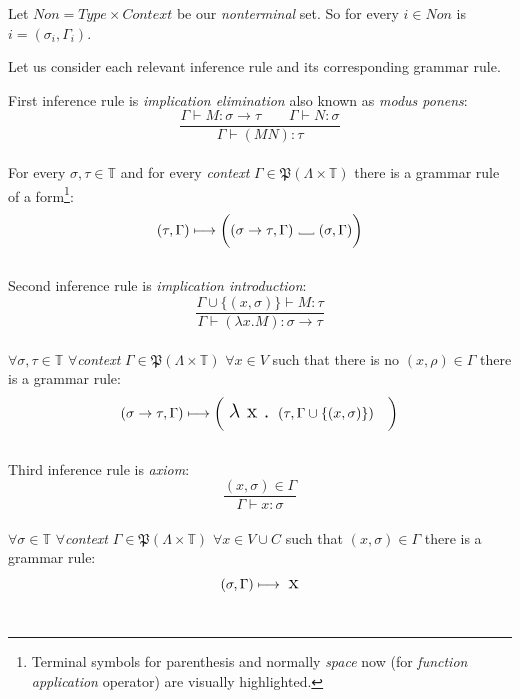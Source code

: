 \documentclass[12pt,a4paper]{report}
\newcommand{\Lets}{Let us }
\newcommand\Vtextvisiblespace[1][.3em]{%
  \mbox{\kern.06em\vrule height.3ex}%
  \vbox{\hrule width#1}%
  \hbox{\vrule height.3ex}}
\begin{document}
Let $Non = Type \times Context $ be our {\it nonterminal} set. 
So for every $i \in Non$ is $i = (\sigma_i , \Gamma_i )$.

\Lets consider each relevant inference rule and its corresponding grammar rule.

First inference rule is {\it implication elimination} also known as 
{\it modus ponens}: 
\[
	\frac{\Gamma \vdash M : \sigma \rightarrow \tau \qquad
		  \Gamma \vdash N : \sigma }
	     {\Gamma \vdash (M N) : \tau }
\]
\\
For every $\sigma, \tau \in \mathbb{T}$ and for every {\it context} 
$\Gamma \in \mathfrak P \left({\Lambda \times  \mathbb{T}}\right)$ there is a grammar rule of a form\footnote{ 
Terminal symbols for parenthesis and normally {\it space} now \textvisiblespace \quad (for {\it function application} operator) are visually highlighted. }: 
\[	
	( \tau , \Gamma )  \longmapsto
	\bigg( ( \sigma \rightarrow \tau , \Gamma ) 
	  \mbox{ \Vtextvisiblespace[1em] } ( \sigma , \Gamma ) \bigg)
\]
\\

Second inference rule is {\it implication introduction}: 
\[
	\frac{\Gamma \cup \{ ( x,\sigma ) \} \vdash M : \tau }
	     {\Gamma \vdash (\lambda x . M) : \sigma \rightarrow \tau }
\]
\\
$\forall \sigma, \tau \in \mathbb{T}$ 
$\forall${\it context} $\Gamma \in \mathfrak P \left({\Lambda \times  \mathbb{T}}\right) $ 
$\forall x \in V $ such that there is no $(x,\rho) \in \Gamma$ 
there is a grammar rule:
\[ 
	( \sigma \rightarrow \tau , \Gamma )  \longmapsto
	\bigg( \mbox{ {\Large $\lambda$ x . }}( \tau , \Gamma \cup \{ (x,\sigma) \} ) \quad \bigg)
\]
\\	

Third inference rule is {\it axiom}: 
\[
		\frac{( x , \sigma )  \in \Gamma}
		     {\Gamma \vdash x : \sigma}
\]
\\
$\forall \sigma \in \mathbb{T}$ 
$\forall${\it context} $\Gamma \in \mathfrak P \left({\Lambda \times  \mathbb{T}}\right) $ 
$\forall x \in V \cup C $ such that $(x,\sigma) \in \Gamma$ 
there is a grammar rule:
\[ 
	( \sigma , \Gamma )  \longmapsto \mbox{ {\Large x}}
\]
\\
\end{document}
